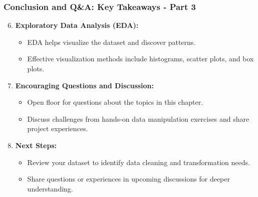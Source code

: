 \documentclass[aspectratio=169]{beamer}
\begin{document}
\begin{frame}[fragile]
  \frametitle{Conclusion and Q\&A: Key Takeaways - Part 3}
  \begin{enumerate}
    \setcounter{enumi}{5} %
    \item \textbf{Exploratory Data Analysis (EDA):}
      \begin{itemize}
        \item EDA helps visualize the dataset and discover patterns.
        \item Effective visualization methods include histograms, scatter plots, and box plots.
      \end{itemize}

    \item \textbf{Encouraging Questions and Discussion:}
      \begin{itemize}
        \item Open floor for questions about the topics in this chapter.
        \item Discuss challenges from hands-on data manipulation exercises and share project experiences.
      \end{itemize}

    \item \textbf{Next Steps:}
      \begin{itemize}
        \item Review your dataset to identify data cleaning and transformation needs.
        \item Share questions or experiences in upcoming discussions for deeper understanding.
      \end{itemize}
  \end{enumerate}
\end{frame}
\end{document}
